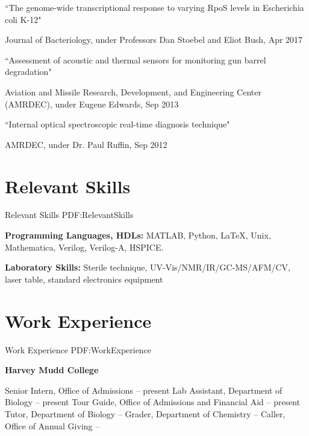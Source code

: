 \documentclass[letterpaper,10pt,oneside]{article}
\begin{document}
\begin{body}
\BulletItemBullet
``The genome-wide transcriptional response to varying RpoS levels in Escherichia coli K-12"
\begin{detail}
\SubBulletItem
Journal of Bacteriology, under Professors Dan Stoebel and Eliot Bush, Apr 2017
\end{detail}

\Gap

\BulletItemBullet
``Assessment of acoustic and thermal sensors for monitoring gun barrel degradation"
\begin{detail}
\SubBulletItem
Aviation and Missile Research, Development, and Engineering Center (AMRDEC), under Eugene Edwards, Sep 2013
\end{detail}

\Gap

\BulletItemBullet
``Internal optical spectroscopic real-time diagnosis technique"
\begin{detail}
\SubBulletItem
AMRDEC, under Dr. Paul Ruffin, Sep 2012
\end{detail}


\section
{Relevant Skills}
{Relevant Skills}
{PDF:RelevantSkills}

{\textbf{Programming Languages, HDLs:}}
MATLAB, Python, \LaTeX, Unix, Mathematica, Verilog, Verilog-A, HSPICE.

\Gap

{\textbf{Laboratory Skills:}}
Sterile technique, UV-Vis/NMR/IR/GC-MS/AFM/CV, laser table, standard electronics equipment


\section
{Work Experience}
{Work Experience}
{PDF:WorkExperience}

{\textbf{Harvey Mudd College}}

\GapNoBreak
\BulletItem
Senior Intern, Office of Admissions \hfill
{} --
present
\BulletItem
Lab Assistant, Department of Biology \hfill
{} --
present
\BulletItem
Tour Guide, Office of Admissions and Financial Aid \hfill
{} --
present
\BulletItem
Tutor, Department of Biology \hfill
{} --
\BulletItem
Grader, Department of Chemistry \hfill
{} --
\BulletItem
Caller, Office of Annual Giving \hfill
{} --


\end{body}
\end{document}
